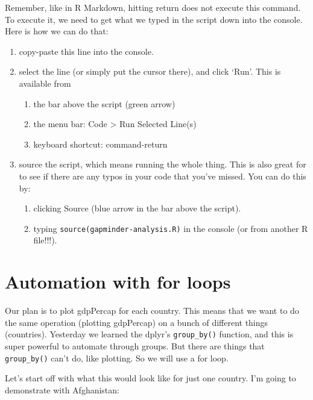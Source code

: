 \documentclass[]{book}
\providecommand{\tightlist}{%
  \setlength{\itemsep}{0pt}\setlength{\parskip}{0pt}}
\theoremstyle{definition}
\theoremstyle{definition}
\theoremstyle{definition}
\theoremstyle{remark}
\begin{document}
Remember, like in R Markdown, hitting return does not execute this
command. To execute it, we need to get what we typed in the script down
into the console. Here is how we can do that:

\begin{enumerate}
\def\labelenumi{\arabic{enumi}.}
\tightlist
\item
  copy-paste this line into the console.
\item
  select the line (or simply put the cursor there), and click `Run'.
  This is available from

  \begin{enumerate}
  \def\labelenumii{\alph{enumii}.}
  \tightlist
  \item
    the bar above the script (green arrow)
  \item
    the menu bar: Code \textgreater{} Run Selected Line(s)
  \item
    keyboard shortcut: command-return
  \end{enumerate}
\item
  source the script, which means running the whole thing. This is also
  great for to see if there are any typos in your code that you've
  missed. You can do this by:

  \begin{enumerate}
  \def\labelenumii{\alph{enumii}.}
  \tightlist
  \item
    clicking Source (blue arrow in the bar above the script).
  \item
    typing
    \texttt{source(\textquotesingle{}gapminder-analysis.R\textquotesingle{})}
    in the console (or from another R file!!!).
  \end{enumerate}
\end{enumerate}

\section{Automation with for loops}\label{automation-with-for-loops}

Our plan is to plot gdpPercap for each country. This means that we want
to do the same operation (plotting gdpPercap) on a bunch of different
things (countries). Yesterday we learned the dplyr's
\texttt{group\_by()} function, and this is super powerful to automate
through groups. But there are things that \texttt{group\_by()} can't do,
like plotting. So we will use a for loop.

Let's start off with what this would look like for just one country. I'm
going to demonstrate with Afghanistan:
\end{document}
